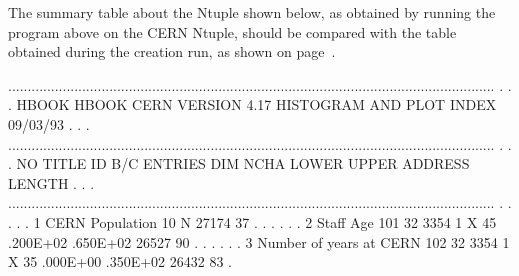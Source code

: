 The summary table about the Ntuple shown below, as obtained by running
the program above on the CERN Ntuple, should be compared
with the table obtained during the creation run, as shown
on page~\pageref{lis:Ntupletabcreation}.

\begin{Listing}
 .............................................................................................................................
 .                                                                                                                           .
 .   HBOOK   HBOOK  CERN            VERSION   4.17       HISTOGRAM AND PLOT INDEX                             09/03/93       .
 .                                                                                                                           .
 .............................................................................................................................
 .                                                                                                                           .
 .  NO                     TITLE                      ID  B/C  ENTRIES DIM   NCHA     LOWER       UPPER       ADDRESS LENGTH .
 .                                                                                                                           .
 .............................................................................................................................
 .                                                                                                                           .
 .                                                                                                                           .
 .   1  CERN Population                               10               N                                        27174     37 .
 .                                                                                                                           .
 .                                                                                                                           .
 .   2  Staff Age                                    101  32     3354  1  X    45    .200E+02    .650E+02       26527     90 .
 .                                                                                                                           .
 .                                                                                                                           .
 .   3  Number of years at CERN                      102  32     3354  1  X    35    .000E+00    .350E+02       26432     83 .

\end{Listing}
